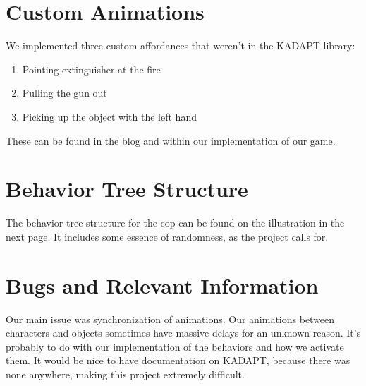 \documentclass[12pt]{article}
\begin{document}
\section*{\center Custom Animations}
\vspace{10pt}

We implemented three custom affordances that weren't in the KADAPT library:

\begin{enumerate}
	\item Pointing extinguisher at the fire
	\item Pulling the gun out
	\item Picking up the object with the left hand
\end{enumerate}

These can be found in the blog and within our implementation of our game.\\

\newpage


\section*{\center Behavior Tree Structure}
\vspace{10pt}

The behavior tree structure for the cop can be found on the illustration in the next page. It includes some essence of randomness, as the project calls for. \\



\newpage


\section*{\center Bugs and Relevant Information}
\vspace{10pt}

Our main issue was synchronization of animations. Our animations between characters and objects sometimes have massive delays for an unknown reason. It's probably to do with our implementation of the behaviors and how we activate them. It would be nice to have documentation on KADAPT, because there was none anywhere, making this project extremely difficult.\\
\end{document}

